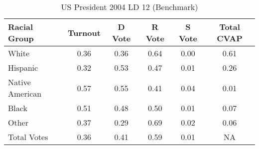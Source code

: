 \begin{table}[htb]
\begin{center}
\caption{US President 2004 LD 12 (Benchmark)}
\label{pres04_cvap_ld_12_benchmark}
\begin{tabular}{lccccc}
  \hline
Racial Group & Turnout & D Vote & R Vote & S Vote & Total CVAP \\ 
  \hline
White & 0.36  & 0.36  & 0.64  & 0.00  & 0.61 \\
    Hispanic & 0.32  & 0.53  & 0.47  & 0.01  & 0.26 \\
    Native American & 0.57  & 0.55  & 0.41  & 0.04  & 0.01 \\
    Black & 0.51  & 0.48  & 0.50  & 0.01  & 0.07 \\
    Other & 0.37  & 0.29  & 0.69  & 0.02  & 0.06 \\
    Total Votes & 0.36  & 0.41  & 0.59  & 0.01  &  NA \\
   \hline
\end{tabular}
\end{center}
\end{table}
